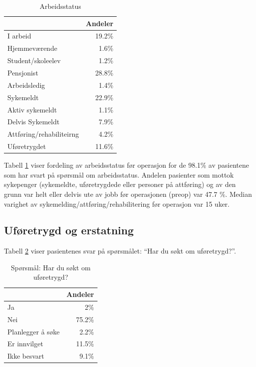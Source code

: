 \documentclass [norsk,a4paper,twoside]{article}\usepackage[]{graphicx}\usepackage[]{color}
\begin{document}
\begin{table}[ht]
\centering
\begin{tabular}{lr}
  \hline
 & Andeler \\ 
  \hline
I arbeid & 19.2\% \\ 
  Hjemmeværende & 1.6\% \\ 
  Student/skoleelev & 1.2\% \\ 
  Pensjonist & 28.8\% \\ 
  Arbeidsledig & 1.4\% \\ 
  Sykemeldt & 22.9\% \\ 
  Aktiv sykemeldt & 1.1\% \\ 
  Delvis Sykemeldt & 7.9\% \\ 
  Attføring/rehabiliteirng & 4.2\% \\ 
  Uføretrygdet & 11.6\% \\ 
   \hline
\end{tabular}
\caption{Arbeidsstatus} 
\label{tab:Arb}
\end{table}


Tabell \ref{tab:Arb} viser fordeling av arbeidsstatus før operasjon for de 98.1\% 
av pasientene som har svart på spørsmål om arbeidsstatus.
Andelen pasienter som mottok sykepenger (sykemeldte, uføretrygdede eller personer 
på attføring) og av den grunn var helt eller delvis ute av jobb før operasjonen (preop) var 
47.7 \%. 
Median varighet av sykemelding/attføring/rehabilitering  før operasjon var 
15 uker.


\clearpage


\subsection{Uføretrygd og erstatning }

Tabell \ref{tab:Ufor} viser pasientenes svar på spørsmålet: ``Har du søkt om uføretrygd?''.

\begin{table}[ht]
\centering
\begin{tabular}{lr}
  \hline
 & Andeler \\ 
  \hline
Ja & 2\% \\ 
  Nei & 75.2\% \\ 
  Planlegger å søke & 2.2\% \\ 
  Er innvilget & 11.5\% \\ 
  Ikke besvart & 9.1\% \\ 
   \hline
\end{tabular}
\caption{Spørsmål: Har du søkt om uføretrygd?} 
\label{tab:Ufor}
\end{table}
\end{document}
